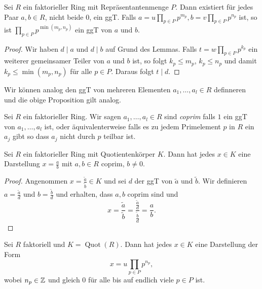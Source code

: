 \begin{proposition}[ggT]
	Sei $R$ ein faktorieller Ring mit Repräsentantenmenge $P$.
	Dann existiert für jedes Paar $a,b \in R$, nicht beide $0$,
	ein ggT. Falls $a = u \prod_{p \in P} p^{m_{p}}, b = v \prod_{p \in P} p^{n_{p}}$ ist, so ist
	$\prod_{p \in P} p^{\min(m_{p},n_{p})}$ ein ggT von $a$ und $b$.
\end{proposition}

\begin{proof}
	Wir haben $d \mid a$ und $d \mid b$ auf Grund des Lemmas.
	Falls $t = w \prod_{p \in P} p^{k_{p}}$ ein weiterer gemeinsamer Teiler von $a$ und $b$ ist,
	so folgt $k_{p} \leq m_{p}$, $k_{p} \leq n_{p}$ und damit $k_{p} \leq \min(m_{p}, n_{p})$ für alle $p \in P$.
	Daraus folgt $t \mid d$.
\end{proof}

Wir können analog den ggT von mehreren Elementen $a_1,\ldots, a_{l} \in R$ definneren und die obige Proposition gilt analog.

\begin{definition}
	Sei $R$ ein faktorieller Ring. Wir sagen $a_1,\ldots,a_{l} \in R$ sind \emph{coprim} falls $1$ ein ggT von
	$a_1,\ldots,a_{l}$ ist, oder äquivalenterweise falls es zu jedem Primelement $p$ in $R$ 
	ein $a_{j}$ gibt so dass $a_{j}$ nicht durch $p$ teilbar ist.
\end{definition}

\begin{corollary}
	Sei $R$ ein faktorieller Ring mit Quotientenkörper $K$.
	Dann hat jedes $x \in K$ eine Darstellung $x = \frac{a}{b}$ mit $a,b \in R$ coprim, $b \neq 0$.
\end{corollary}

\begin{proof}
	Angenommen $x = \frac{\widetilde{a}}{\widetilde{b}} \in K$ und sei $d$ der ggT von $\widetilde{a}$ und $\widetilde{b}$.
	Wir definieren $a = \frac{\widetilde{a}}{d}$ und $b = \frac{\widetilde{b}}{d}$ und erhalten, dass $a,b$ coprim
	sind und 
	\[
	x = \frac{\widetilde{a}}{\widetilde{b}} = \frac{\frac{\widetilde{a}}{d}}{\frac{\widetilde{b}}{d}} = \frac{a}{b}
	.\] 
\end{proof}

\begin{corollary}
	Sei $R$ faktoriell und $K = \operatorname{Quot}(R)$. Dann hat jedes $x \in K$ eine Darstellung der Form 
	\[
	x = u \prod_{p \in P} p^{n_{p}}
	,\]
	wobei $n_{p} \in \mathbb{Z}$ und gleich $0$ für alle bis auf endlich viele $p \in P$ ist.
\end{corollary}

